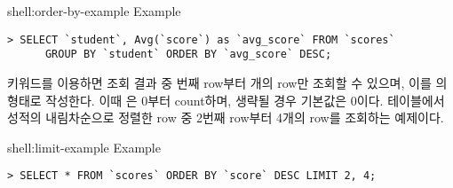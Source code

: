 \begin{shellenv}{shell:order-by-example}{ Example}\begin{verbatim}
> SELECT `student`, Avg(`score`) as `avg_score` FROM `scores`
      GROUP BY `student` ORDER BY `avg_score` DESC;
\end{verbatim}
\end{shellenv}

 키워드를 이용하면 조회 결과 중 번째 row부터 개의 row만 조회할 수 있으며, 이를 의 형태로 작성한다. 이때 은 0부터 count하며, 생략될 경우 기본값은 0이다. \은  테이블에서 성적의 내림차순으로 정렬한 row 중 2번째 row부터 4개의 row를 조회하는 예제이다.

\begin{shellenv}{shell:limit-example}{ Example}\begin{verbatim}
> SELECT * FROM `scores` ORDER BY `score` DESC LIMIT 2, 4;
\end{verbatim}
\end{shellenv}
